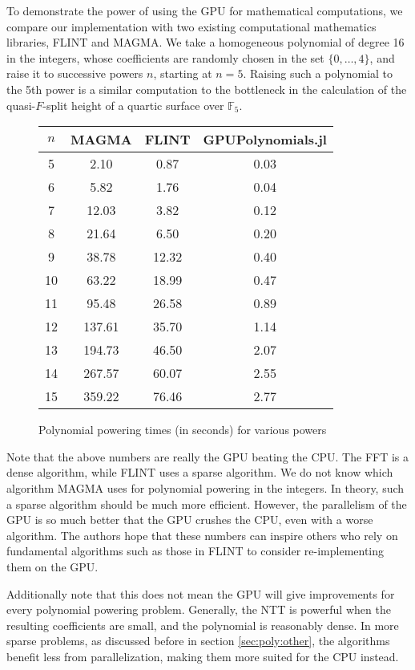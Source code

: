 To demonstrate the power of using the GPU for mathematical computations, 
we compare our implementation
with two existing computational mathematics libraries, FLINT
and MAGMA.
We take a homogeneous polynomial of degree 16 in the integers,
whose coefficients are randomly chosen in the set 
\(\{0, \ldots, 4\}\), and raise it to successive powers \(n\),
starting at \(n=5\).
Raising such a polynomial to the 5th power is a similar 
computation to the bottleneck in the calculation of the
quasi-\(F\)-split height of a quartic surface over \(\mathbb{F}_{5}\).

\begin{figure}[h]
\begin{center}
\begin{tabular}{|c|c|c|c|}
    \hline
    \(n\) & MAGMA & FLINT & GPUPolynomials.jl \\
    \hline
    5 & 2.10 &    0.87 &  0.03 \\
    \hline
    6 & 5.82 &    1.76 &  0.04 \\
    \hline
    7 & 12.03 &   3.82 &  0.12 \\
    \hline
    8 & 21.64 &   6.50 &  0.20 \\
    \hline
    9 & 38.78 &   12.32 & 0.40 \\
    \hline
    10 & 63.22 &  18.99 & 0.47 \\
    \hline
    11 & 95.48 &  26.58 & 0.89 \\
    \hline
    12 & 137.61 & 35.70 & 1.14 \\
    \hline
    13 & 194.73 & 46.50 & 2.07 \\
    \hline
    14 & 267.57 & 60.07 & 2.55 \\
    \hline
    15 & 359.22 & 76.46 & 2.77 \\
    \hline
\end{tabular}
\caption{Polynomial powering times (in seconds) for various powers}
\end{center}
\end{figure}

Note that the above numbers are really the GPU beating the CPU.
The FFT is a dense algorithm, while FLINT uses a sparse algorithm.
We do not know which algorithm MAGMA uses for polynomial powering
in the integers.
In theory, such a sparse algorithm should
be much more efficient.
However, the parallelism of the GPU is so much better that the
GPU crushes the CPU, even with a worse algorithm.
The authors hope that these numbers can inspire others who
rely on fundamental algorithms such as those in FLINT to 
consider re-implementing them on the GPU.

Additionally note that this does not mean the GPU will give 
improvements for every polynomial powering 
problem. Generally, the NTT is powerful when the resulting 
coefficients are small, and the polynomial is reasonably dense. 
In more sparse problems, as discussed before in section \ref{sec:poly:other}, 
the algorithms benefit less from parallelization, making them more 
suited for the CPU instead.